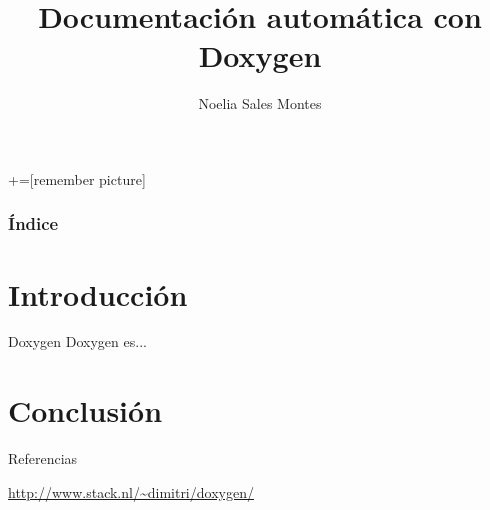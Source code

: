 \documentclass[12pt,xcolor=svgnames]{beamer}
\title[Doxygen]{Documentación automática con Doxygen}
\author[Noelia Sales]{Noelia Sales Montes}
\institute[DV - UCA]{Diseño de Videojuegos\\
Universidad de Cádiz}
\date{}
\begin{document}
+=[remember picture]
\everymath{\displaystyle}

\begin{frame}
 \titlepage
\end{frame}

\begin{frame}
\frametitle{Índice} 
\transboxin
\tableofcontents
\end{frame}

\section{Introducción}

\begin{frame}{Doxygen}
  Doxygen es...
\end{frame}


\section{Conclusión}

\begin{frame}{Referencias}
  \begin{thebibliography}{6}
  \bibitem{} \url{http://www.stack.nl/~dimitri/doxygen/}
  \end{thebibliography}
\end{frame}

\licencia
\end{document}
